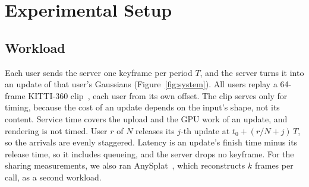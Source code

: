 \section{Experimental Setup}
\label{sec:setup}

\subsection{Workload}

Each user sends the server one keyframe per period $T$, and the server turns it into an update of that user's Gaussians (Figure~\ref{fig:system}).
All users replay a 64-frame KITTI-360 clip~\cite{kitti360}, each user from its own offset. %
The clip serves only for timing, because the cost of an update depends on the input's shape, not its content. %
Service time covers the upload and the GPU work of an update, and rendering is not timed. %
User $r$ of $N$ releases its $j$-th update at $t_0 + (r/N + j)\,T$, so the arrivals are evenly staggered.
Latency is an update's finish time minus its release time, so it includes queueing, and the server drops no keyframe. %
For the sharing measurements, we also ran AnySplat~\cite{anysplat2025}, which reconstructs $k$ frames per call, as a second workload. %

